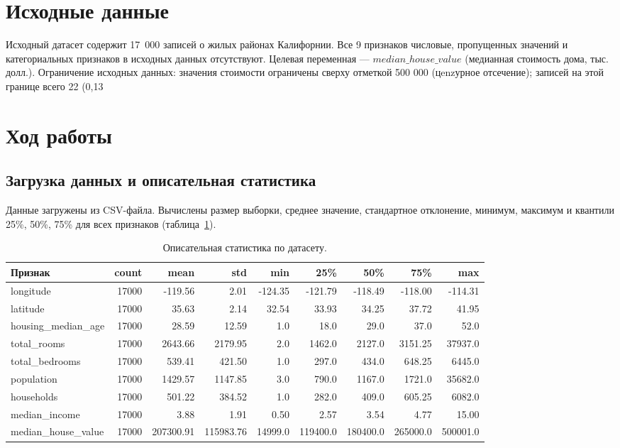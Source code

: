 \documentclass[12pt,a4paper]{article}
\begin{document}
\section{Исходные данные}
Исходный датасет содержит 17~000 записей о жилых районах Калифорнии. Все 9 признаков числовые, пропущенных значений и категориальных признаков в исходных данных отсутствуют. Целевая переменная --- $median\_house\_value$ (медианная стоимость дома, тыс. долл.). Ограничение исходных данных: значения стоимости ограничены сверху отметкой 500 000 (цenzурное отсечение); записей на этой границе всего 22 (0,13 %

\section{Ход работы}
\subsection{Загрузка данных и описательная статистика}
Данные загружены из CSV-файла. Вычислены размер выборки, среднее значение, стандартное отклонение, минимум, максимум и квантили 25\%, 50\%, 75\% для всех признаков (таблица~\ref{tab:stats}).

\begin{table}[H]
\centering
\caption{Описательная статистика по датасету.}
\label{tab:stats}
\small
\begin{tabular}{lrrrrrrrr}
\toprule
Признак & count & mean & std & min & 25\% & 50\% & 75\% & max \\
\midrule
longitude & 17000 & -119.56 & 2.01 & -124.35 & -121.79 & -118.49 & -118.00 & -114.31 \\
latitude & 17000 & 35.63 & 2.14 & 32.54 & 33.93 & 34.25 & 37.72 & 41.95 \\
housing\_median\_age & 17000 & 28.59 & 12.59 & 1.0 & 18.0 & 29.0 & 37.0 & 52.0 \\
total\_rooms & 17000 & 2643.66 & 2179.95 & 2.0 & 1462.0 & 2127.0 & 3151.25 & 37937.0 \\
total\_bedrooms & 17000 & 539.41 & 421.50 & 1.0 & 297.0 & 434.0 & 648.25 & 6445.0 \\
population & 17000 & 1429.57 & 1147.85 & 3.0 & 790.0 & 1167.0 & 1721.0 & 35682.0 \\
households & 17000 & 501.22 & 384.52 & 1.0 & 282.0 & 409.0 & 605.25 & 6082.0 \\
median\_income & 17000 & 3.88 & 1.91 & 0.50 & 2.57 & 3.54 & 4.77 & 15.00 \\
median\_house\_value & 17000 & 207300.91 & 115983.76 & 14999.0 & 119400.0 & 180400.0 & 265000.0 & 500001.0 \\
\bottomrule
\end{tabular}
\end{table}
\end{document}
